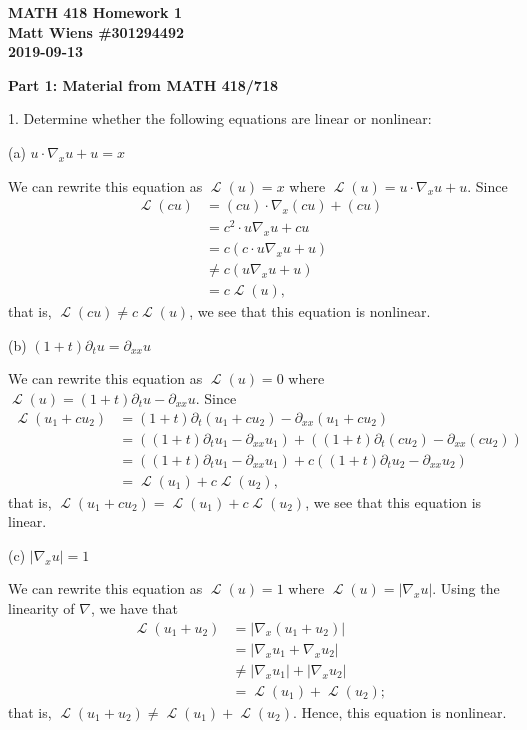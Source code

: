 \documentclass{article}
\DeclareMathOperator{\Lagr}{\mathcal{L}}
\begin{document}
\textbf{MATH 418 Homework 1} \\
\textbf{Matt Wiens \#301294492} \\
\textbf{2019-09-13}

\textbf{Part 1: Material from MATH 418/718}

1. Determine whether the following equations are linear or nonlinear:

(a) $u \cdot \nabla_{x} u + u = x$

We can rewrite this equation as $\Lagr(u) = x$ where
$\Lagr(u) = u \cdot \nabla_{x} u + u$. Since
%
\begin{align*}
    \Lagr(c u)
        &= (c u) \cdot \nabla_x (c u) + (c u) \\
        &= c^2 \cdot u \nabla_x u + c u \\
        &= c \left(c \cdot u \nabla_x u + u \right) \\
        &\neq c \left(u \nabla_x u + u \right) \\
        &= c \Lagr(u),
\end{align*}
%
that is, $\Lagr(c u) \neq c \Lagr(u)$, we see that this equation is nonlinear.

(b) $(1 + t) \partial_{t} u = \partial_{x x} u$

We can rewrite this equation as $\Lagr(u) = 0$ where
$\Lagr(u) = (1 + t) \partial_{t} u - \partial_{x x} u$. Since
%
\begin{align*}
    \Lagr(u_1 + c u_2)
        &= (1 + t) \partial_{t} (u_1 + c u_2) - \partial_{x x} (u_1 + c u_2) \\
        &= \left( (1 + t) \partial_{t} u_1 - \partial_{x x} u_1 \right)
           + \left( (1 + t) \partial_{t} (c u_2) -  \partial_{x x} (c u_2) \right) \\
        &= \left( (1 + t) \partial_{t} u_1 - \partial_{x x} u_1 \right)
           + c \left( (1 + t) \partial_{t} u_2 -  \partial_{x x} u_2 \right) \\
        &= \Lagr(u_1) + c \Lagr(u_2),
\end{align*}
%
that is, $\Lagr(u_1 + c u_2) = \Lagr(u_1) + c \Lagr(u_2)$, we see that
this equation is linear.

(c) $\left| \nabla_{x} u \right| = 1$

We can rewrite this equation as $\Lagr(u) = 1$ where
$\Lagr(u) = \left| \nabla_{x} u \right|$. Using the linearity of
$\nabla$, we have that
%
\begin{align*}
    \Lagr(u_1 + u_2)
        &= \left| \nabla_{x} (u_1 + u_2) \right| \\
        &= \left| \nabla_{x} u_1 + \nabla_{x} u_2 \right| \\
        &\neq \left| \nabla_{x} u_1 \right| + \left| \nabla_{x} u_2 \right| \\
        &= \Lagr(u_1) + \Lagr(u_2);
\end{align*}
%
that is, $\Lagr(u_1 + u_2) \neq \Lagr(u_1) + \Lagr(u_2)$. Hence, this
equation is nonlinear.
\end{document}
